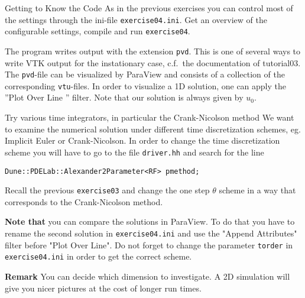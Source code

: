 \documentclass[12pt,a4paper]{article}
\begin{document}
\begin{Exercise}{Getting to Know the Code}
  As in the previous exercises you can control most of the settings
  through the ini-file \lstinline!exercise04.ini!. Get an overview of
  the configurable settings, compile and run \lstinline!exercise04!.

  The program writes output with the extension \lstinline!pvd!. This
  is one of several ways to write VTK output for the instationary
  case, c.f.~the documentation of tutorial03. The \lstinline!pvd!-file
  can be visualized by ParaView and consists of a collection of the
  corresponding \lstinline!vtu!-files. In order to visualize a 1D
  solution, one can apply the ''Plot Over Line '' filter. Note that
  our solution is always given by $u_0$.
\end{Exercise}

\begin{Exercise}{Try various time integrators, in particular the Crank-Nicolson method}
  We want to examine the numerical solution under different time
  discretization schemes, eg. Implicit Euler or Crank-Nicolson. In
  order to change the time discretization scheme you will have to go
  to the file \lstinline!driver.hh! and search for the line
  \begin{lstlisting}
Dune::PDELab::Alexander2Parameter<RF> pmethod;
  \end{lstlisting}

  Recall the previous \lstinline!exercise03! and change the one step
  $\theta$ scheme in a way that corresponds to the Crank-Nicolson
  method.

  \textbf{Note that} you can compare the solutions in ParaView. To do
  that you have to rename the second solution in
  \lstinline!exercise04.ini! and use the "Append Attributes" filter
  before "Plot Over Line". Do not forget to change the parameter
  \lstinline!torder! in \lstinline!exercise04.ini! in order to get the
  correct scheme.

  \textbf{Remark} You can decide which dimension to investigate. A 2D
  simulation will give you nicer pictures at the cost of longer run
  times.
\end{Exercise}
\end{document}
